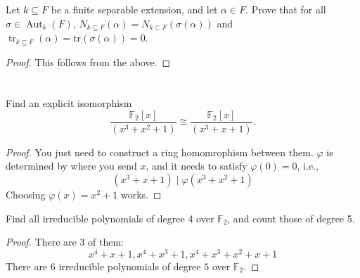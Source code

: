 \documentclass[openany]{book}
\newcommand{\tr}{\text{tr}}
\newcommand{\F}{\mathbb{F}}
\begin{document}
        
        \begin{prob}
        Let \( k \subseteq F \) be a finite separable extension, and let \(\alpha \in F\). Prove that for all \(\sigma \in \operatorname{Aut}_k(F)\), \(N_{k \subseteq F}(\alpha) = N_{k\subset F}(\sigma(\alpha))\) and \(\operatorname{tr}_{k \subseteq F}(\alpha)=\tr(\sigma(\alpha)) = 0\).
        \end{prob}
        \begin{proof}
            This follows from the above.
        \end{proof}
        


\section{}





\begin{prob}
Find an explicit isomorphism
\[ \frac{\mathbb{F}_2[x]}{(x^3 + x^2 + 1)} \cong \frac{\mathbb{F}_2[x]}{(x^3 + x + 1)}. \]
\end{prob}
\begin{proof}
    You just need to construct a ring homomrophism between them. $\varphi$ is determined by where you send $x$, and it needs to satisfy $\varphi(0)=0$, i.e., 
    \begin{equation*}
        (x^3+x+1)\mid \varphi(x^3+x^2+1)
    \end{equation*}
    Choosing $\varphi(x)=x^2+1$ works.
\end{proof}









\begin{prob}
Find all irreducible polynomials of degree 4 over $\mathbb{F}_2$, and count those of degree 5.
\end{prob}
\begin{proof}

        There are $3$ of them:
        \begin{equation*}
            x^4+x+1, x^4+x^3+1, x^4+x^3+x^2+x+1
        \end{equation*}
        There are $6$ irreducible polynomials of degree $5$ over $\F_2$.

\end{proof}
\end{document}
